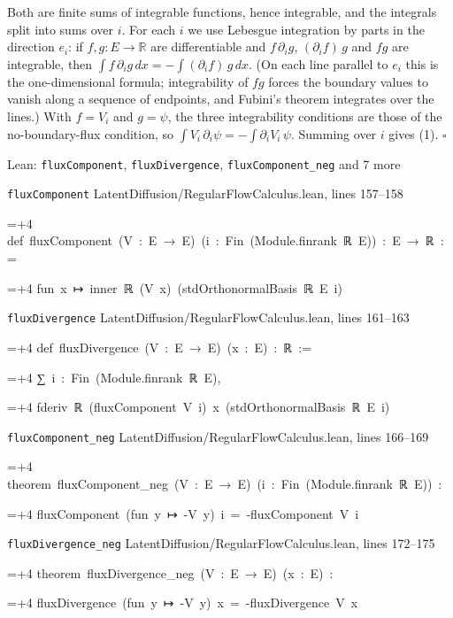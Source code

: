\documentclass[11pt,a4paper]{report}
\newlength{\leancharwidth}
\newenvironment{leancode}{\par\smallskip\begingroup\ttfamily\footnotesize\raggedright
  \settowidth{\leancharwidth}{M}\setlength{\parskip}{0pt}\setlength{\parindent}{0pt}
  \frenchspacing}{\par\endgroup\smallskip}
\newcommand{\leanline}[2]{\hangindent=\dimexpr#1\leancharwidth+4\leancharwidth\relax
  \hangafter=1\noindent\hspace*{#1\leancharwidth}#2\par}
\newcommand{\leansource}[1]{\par{\footnotesize\color{leanmuted}#1}\par}
\begin{document}
Both are finite sums of integrable functions, hence integrable, and the integrals split into sums over \(i\). For each \(i\) we use Lebesgue integration by parts in the direction \(e_i\): if \(f,g:E\to\mathbb R\) are differentiable and \(f\,\partial_ig\), \((\partial_if)\,g\) and \(fg\) are integrable, then \(\int f\,\partial_ig\,dx=-\int(\partial_if)\,g\,dx\). (On each line parallel to \(e_i\) this is the one-dimensional formula; integrability of \(fg\) forces the boundary values to vanish along a sequence of endpoints, and Fubini's theorem integrates over the lines.) With \(f=V_i\) and \(g=\psi\), the three integrability conditions are those of the no-boundary-flux condition, so \(\int V_i\,\partial_i\psi=-\int\partial_iV_i\,\psi\). Summing over \(i\) gives (1). \(\square\)

\begin{leanbox}{Lean: \texttt{fluxComponent}, \texttt{fluxDivergence}, \texttt{fluxComponent\_\allowbreak{}neg} and 7 more}
\leansource{\texttt{fluxComponent} \quad LatentDiffusion/\allowbreak{}RegularFlowCalculus.lean, lines 157–158}
\begin{leancode}
\leanline{0}{def\ fluxComponent\ (V\ :\ E\ →\ E)\ (i\ :\ Fin\ (Module.finrank\ ℝ\ E))\ :\ E\ →\ ℝ\ :=}
\leanline{2}{fun\ x\ ↦\ inner\ ℝ\ (V\ x)\ (stdOrthonormalBasis\ ℝ\ E\ i)}
\end{leancode}
\leansource{\texttt{fluxDivergence} \quad LatentDiffusion/\allowbreak{}RegularFlowCalculus.lean, lines 161–163}
\begin{leancode}
\leanline{0}{def\ fluxDivergence\ (V\ :\ E\ →\ E)\ (x\ :\ E)\ :\ ℝ\ :=}
\leanline{2}{∑\ i\ :\ Fin\ (Module.finrank\ ℝ\ E),}
\leanline{4}{fderiv\ ℝ\ (fluxComponent\ V\ i)\ x\ (stdOrthonormalBasis\ ℝ\ E\ i)}
\end{leancode}
\leansource{\texttt{fluxComponent\_\allowbreak{}neg} \quad LatentDiffusion/\allowbreak{}RegularFlowCalculus.lean, lines 166–169}
\begin{leancode}
\leanline{0}{theorem\ fluxComponent\_neg\ (V\ :\ E\ →\ E)\ (i\ :\ Fin\ (Module.finrank\ ℝ\ E))\ :}
\leanline{4}{fluxComponent\ (fun\ y\ ↦\ -V\ y)\ i\ =\ -fluxComponent\ V\ i}
\end{leancode}
\leansource{\texttt{fluxDivergence\_\allowbreak{}neg} \quad LatentDiffusion/\allowbreak{}RegularFlowCalculus.lean, lines 172–175}
\begin{leancode}
\leanline{0}{theorem\ fluxDivergence\_neg\ (V\ :\ E\ →\ E)\ (x\ :\ E)\ :}
\leanline{4}{fluxDivergence\ (fun\ y\ ↦\ -V\ y)\ x\ =\ -fluxDivergence\ V\ x}
\end{leancode}

\end{leanbox}
\end{document}
